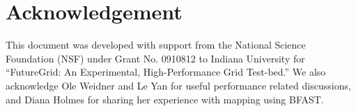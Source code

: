 \documentclass{acm_proc_article-sp}
\begin{document}
\section*{Acknowledgement}

This document was developed with support from the National Science
Foundation (NSF) under Grant No.  0910812 to Indiana University for
``FutureGrid: An Experimental, High-Performance Grid Test-bed.''  We
also acknowledge Ole Weidner and Le Yan for useful performance related
discussions, and Diana Holmes for sharing her experience with mapping
using BFAST.


\end{document}
